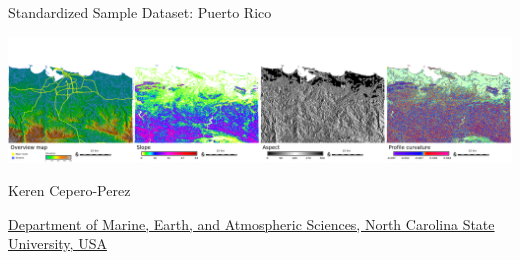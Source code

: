\documentclass[xcolor={dvipsnames,usenames},beamer,aspectratio=169]{beamer}
\begin{document}
\begin{frame}{Standardized Sample Dataset: Puerto Rico}

\begin{center}
\includegraphics[width=\textwidth]{./images/dataset/std_dataset_pr_stripe.png}
\end{center}

Keren Cepero-Perez

{\scriptsize
\href{http://www.meas.ncsu.edu/}%
{Department of Marine, Earth, and Atmospheric Sciences,
North Carolina State University, USA}
}

\end{frame}
\end{document}
